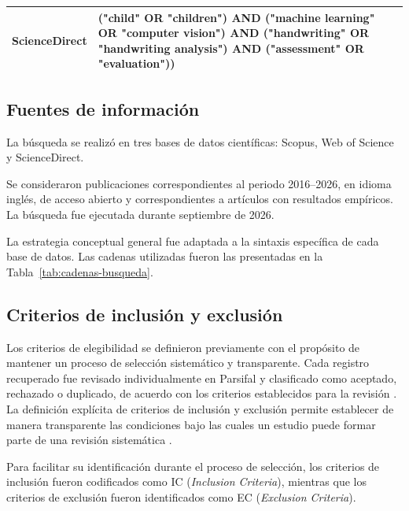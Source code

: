 \documentclass{iaesarticle}
\begin{document}
\begin{longtable}{%
    |>{\raggedright\arraybackslash}p{}%
    |>{\raggedright\arraybackslash}p{}|}
\textbf{ScienceDirect} &
{\ttfamily
("child" OR "children")
\newline
AND ("machine learning" OR "computer vision")
\newline
AND ("handwriting" OR "handwriting analysis")
\newline
AND ("assessment" OR "evaluation"))
}
\\
\hline

\end{longtable}

\subsection{Fuentes de información}

La búsqueda se realizó en tres bases de datos científicas: Scopus, Web of Science y ScienceDirect.

Se consideraron publicaciones correspondientes al periodo 2016--2026, en idioma inglés, de acceso abierto y correspondientes a artículos con resultados empíricos. La búsqueda fue ejecutada durante septiembre de 2026.

La estrategia conceptual general fue adaptada a la sintaxis específica de cada base de datos. Las cadenas utilizadas fueron las presentadas en la Tabla~\ref{tab:cadenas-busqueda}.

\subsection{Criterios de inclusión y exclusión}

Los criterios de elegibilidad se definieron previamente con el propósito de mantener un proceso de selección sistemático y transparente. Cada registro recuperado fue revisado individualmente en Parsifal y clasificado como aceptado, rechazado o duplicado, de acuerdo con los criterios establecidos para la revisión \cite{kitchenham2007}. La definición explícita de criterios de inclusión y exclusión permite establecer de manera transparente las condiciones bajo las cuales un estudio puede formar parte de una revisión sistemática \cite{TUGWELL2021A5}.

Para facilitar su identificación durante el proceso de selección, los criterios de inclusión fueron codificados como IC (\textit{Inclusion Criteria}), mientras que los criterios de exclusión fueron identificados como EC (\textit{Exclusion Criteria}).
\end{document}
